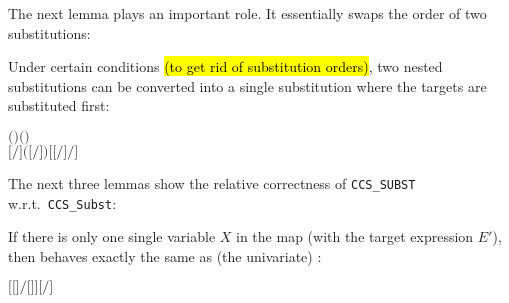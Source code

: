 The next lemma plays an important role. It essentially swaps the order of two substitutions:
\begin{lemma}
Under certain conditions \hl{(to get rid of substitution orders)}, two nested substitutions can be
converted into a single substitution where the targets are substituted first:
\begin{alltt}
\HOLTokenTurnstile{}   \HOLSymConst{\HOLTokenConj{}}   \HOLSymConst{\ensuremath{=}}   \HOLSymConst{\HOLTokenConj{}}   \HOLSymConst{\ensuremath{=}}   \HOLSymConst{\HOLTokenConj{}}
    \ensuremath{(} \ensuremath{)} \ensuremath{(} \ensuremath{)} \HOLSymConst{\HOLTokenImp{}}
   \ensuremath{[}\ensuremath{/}\ensuremath{]} \ensuremath{(}\ensuremath{[}\ensuremath{/}\ensuremath{]} \ensuremath{)} \HOLSymConst{\ensuremath{=}} \ensuremath{[} \ensuremath{[}\ensuremath{/}\ensuremath{]} \ensuremath{/}\ensuremath{]} 
\end{alltt}
\end{lemma}

The next three lemmas show the relative correctness of \texttt{CCS\_SUBST}
w.r.t.~\texttt{CCS\_Subst}:
\begin{lemma}
  If there is only one single variable $X$ in the map (with the target
  expression $E'$), then  behaves exactly the
  same as (the univariate) :
\begin{alltt}
\HOLTokenTurnstile{} \ensuremath{[}\ensuremath{[}\ensuremath{]}\ensuremath{/}\ensuremath{[}\ensuremath{]}\ensuremath{]}  \HOLSymConst{\ensuremath{=}} \ensuremath{[}\ensuremath{/}\ensuremath{]} 
\end{alltt}
\end{lemma}

